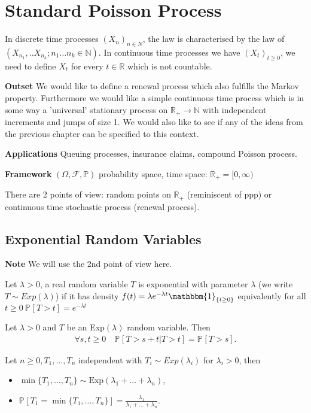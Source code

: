 \chapter{Standard Poisson Process}
In discrete time processes $(X_n)_{n\in N}$, the law is characterised by the law of $(X_{n_1},..X_{n_k}; n_1 \ldots n_k \in \mathbb{N})$. In continuous time processes we have $(X_t)_{t\geq 0}$, we need to define $X_t$ for every $ t \in \mathbb{R}$ which is not countable.

\noindent \textbf{Outset} We would like to define a renewal process which also fulfills the Markov property. Furthermore we would like a simple continuous time process which is in some way a 'universal' stationary process on $\mathbb{R}_+ \to \mathbb{N}$ with independent increments and jumps of size 1. We would also like to see if any of the ideas from the previous chapter can be specified to this context.

\textbf{Applications} Queuing processes, insurance claims, compound Poisson process.

\textbf{Framework} $(\Omega, \mathcal{F}, \mathbb{P})$ probability space, time space: $\mathbb{R}_{+}=[0,\infty)$ 

There are 2 points of view: random points on $\mathbb{R}_{+}$ (reminiscent of ppp) or continuous time stochastic process (renewal process).

\section{Exponential Random Variables}
\textbf{Note} We will use the 2nd point of view here.

\begin{defn}
	Let $\lambda> 0$, a real random variable $T$ is exponential with parameter $\lambda$ (we write $T \sim Exp(\lambda)$) if it has density $f(t) = \lambda e ^{-\lambda t} \mathbbm{1}_{\{t\geq 0\}}$ equivalently for all $t\geq 0\ \mathbb{P}_{} \left[ T>t \right] = e^{-\lambda t}$
\end{defn}

\begin{prop}
	Let $\lambda > 0$ and $T$ be an Exp$(\lambda)$ random variable. Then  
	\begin{align}
		\boxed{\forall s,t\geq 0\quad \mathbb{P}_{} \left[ T>s+t | T>t \right] = \mathbb{P}_{} \left[ T>s \right]. }
	\end{align}
\end{prop}
\begin{prop}
	Let $n\geq 0, T_1, \ldots ,T_n$ independent with $T_i \sim Exp(\lambda_i)$ for $ \lambda_i > 0$, then 
\begin{itemize}
	\item $\min\{T_1, \ldots, T_n\} \sim \textrm{Exp}(\lambda_1+ \ldots +\lambda_n)$,
	\item $\mathbb{P}_{} \left[ T_1 = \min\{T_1, \ldots ,T_n\} \right] = \frac{\lambda_1}{\lambda_1+ \ldots +\lambda_n}$.
\end{itemize}

\end{prop}
 

